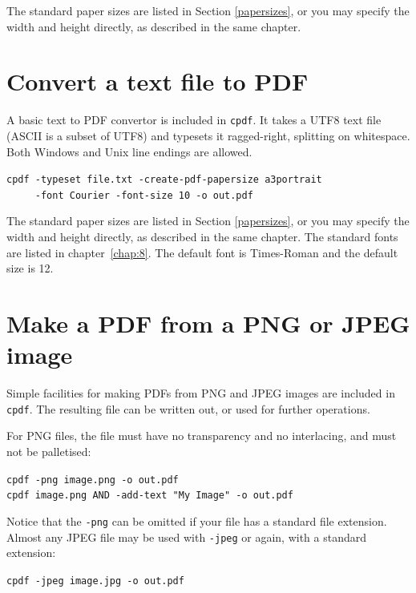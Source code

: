 \documentclass{book}
\begin{document}
\noindent The standard paper sizes are listed in Section \ref{papersizes}, or you may specify the width and height directly, as described in the same chapter.

\section{Convert a text file to PDF}
A basic text to PDF convertor is included in \texttt{cpdf}. It takes a UTF8 text file (ASCII is a subset of UTF8) and typesets it ragged-right, splitting on whitespace. Both Windows and Unix line endings are allowed. 

\begin{framed}
 \noindent\small\verb?cpdf -typeset file.txt -create-pdf-papersize a3portrait?\\
 \noindent\small\verb?     -font Courier -font-size 10 -o out.pdf?
\end{framed}

\noindent The standard paper sizes are listed in Section \ref{papersizes}, or you may specify the width and height directly, as described in the same chapter. The standard fonts are listed in chapter~\ref{chap:8}. The default font is Times-Roman and the default size is 12.

\section{Make a PDF from a PNG or JPEG image}

Simple facilities for making PDFs from PNG and JPEG images are included in \texttt{cpdf}. The resulting file can be written out, or used for further operations.

For PNG files, the file must have no transparency and no interlacing, and must not be palletised:

\begin{framed}
 \noindent\small\verb?cpdf -png image.png -o out.pdf?\\
 \noindent\small\verb?cpdf image.png AND -add-text "My Image" -o out.pdf?
\end{framed}

\noindent Notice that the \texttt{-png} can be omitted if your file has a standard file extension. Almost any JPEG file may be used with \texttt{-jpeg} or again, with a standard extension:

\begin{framed}
 \noindent\small\verb?cpdf -jpeg image.jpg -o out.pdf?
\end{framed}
\end{document}
